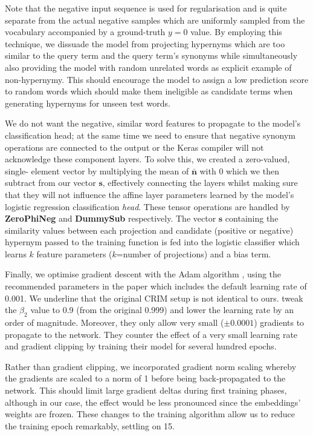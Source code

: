 Note that the negative input sequence is used for regularisation and is quite separate from the actual negative samples which are uniformly sampled from the vocabulary accompanied by a ground-truth $y=0$ value.  By employing this technique, we dissuade the model from projecting hypernyms which are too similar to the query term and the query term's synonyms while simultaneously also providing the model with random unrelated words as explicit example of non-hypernymy.  This should encourage the model to assign a low prediction score to random words which should make them ineligible as candidate terms when generating hypernyms for unseen test words.

We do not want the negative, similar word features to propagate to the model's classification head; at the same time we need to ensure that negative synonym operations are connected to the output or the Keras compiler will not acknowledge these component layers.  To solve this, we created a zero-valued, single- element vector by multiplying the mean of $\bm{\bar{n}}$ with 0 which we then subtract from our vector $\bm{s}$, effectively connecting the layers whilst making sure that they will not influence the affine layer parameters learned by the model's logistic regression classification \textit{head}.  These tensor operations are handled by \textbf{ZeroPhiNeg} and \textbf{DummySub} respectively.  The vector $\bm{s}$ containing the similarity values between each projection and candidate (positive or negative) hypernym passed to the training function is fed into the logistic classifier which learns $k$ feature parameters ($k$=number of projections) and a bias term.

Finally, we optimise gradient descent with the Adam algorithm \citep{kingma2014adam}, using the recommended parameters in the paper which includes the default learning rate of 0.001.  We underline that the original CRIM setup is not identical to ours.  \citet{bernier2018crim} tweak the $\beta_2$ value to 0.9 (from the original 0.999) and lower the learning rate by an order of magnitude.  Moreover, they only allow very small ($\pm0.0001$) gradients to propagate to the network.  They counter the effect of a very small learning rate and gradient clipping by training their model for several hundred epochs.  

Rather than gradient clipping, we incorporated gradient norm scaling whereby the gradients are scaled to a norm of 1 before being back-propagated to the network.  This should limit large gradient deltas during first training phases, although in our case, the effect would be less pronounced since the embeddings' weights are frozen.  These changes to the training algorithm allow us to reduce the training epoch remarkably, settling on 15.     

